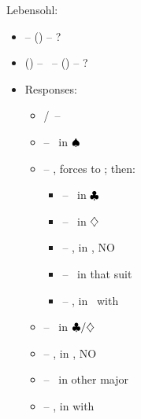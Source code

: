 Lebensohl:

\begin{itemize}
  \item {} -- () -- ?
  \item () -- \dbl\ -- (\pass) -- ?
  \item Responses:
    \begin{itemize}
      \item \pass/\dbl\ -- \pen
      \item {} -- \inv\ in $\spadesuit$
      \item {} -- \art, forces to ; then:
        \begin{itemize}
          \item \pass -- \so\ in $\clubsuit$
          \item {} -- \so\ in $\diamondsuit$
          \item {} -- \gf,  in \om, NO \stopper
          \item {} -- \gf\ in that suit
          \item {} -- \gf,  in \om\ with \stopper
        \end{itemize}
      \item {} -- \inv\ in $\clubsuit/\diamondsuit$
      \item {} -- \gf,  in \om, NO \stopper
      \item {} -- \inv\ in other major
      \item {} -- \gf,  in \om with \stopper
    \end{itemize}
\end{itemize}
